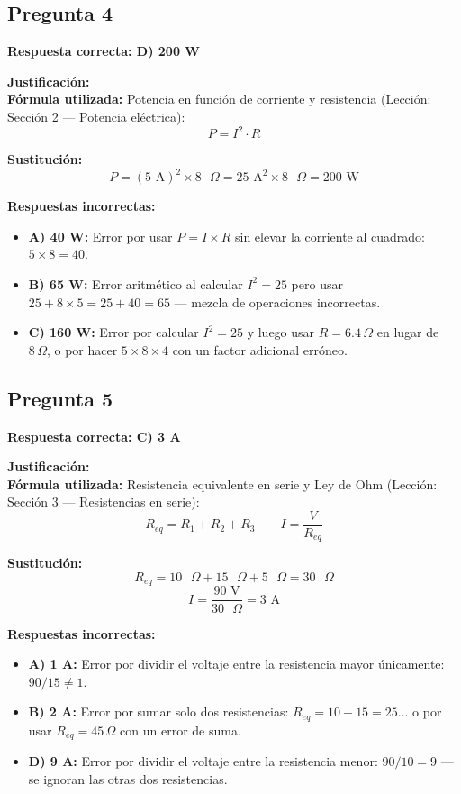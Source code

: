 \begin{respuestabox}
\subsection{Pregunta 4}
\textcolor{verdecorrecto}{\textbf{Respuesta correcta: D) 200 W}}

\textbf{Justificación:}\\
\textbf{Fórmula utilizada:} Potencia en función de corriente y resistencia (Lección: Sección 2 — Potencia eléctrica):
$$P = I^2 \cdot R$$

\textbf{Sustitución:}
$$P = (5 \text{ A})^2 \times 8 \text{ }\Omega = 25 \text{ A}^2 \times 8 \text{ }\Omega = 200 \text{ W}$$

\textbf{Respuestas incorrectas:}
\begin{itemize}
    \item \textbf{A) 40 W:} Error por usar $P = I \times R$ sin elevar la corriente al cuadrado: $5 \times 8 = 40$.
    \item \textbf{B) 65 W:} Error aritmético al calcular $I^2 = 25$ pero usar $25 + 8 \times 5 = 25 + 40 = 65$ — mezcla de operaciones incorrectas.
    \item \textbf{C) 160 W:} Error por calcular $I^2 = 25$ y luego usar $R = 6.4\,\Omega$ en lugar de $8\,\Omega$, o por hacer $5 \times 8 \times 4$ con un factor adicional erróneo.
\end{itemize}
\end{respuestabox}

\begin{respuestabox}
\subsection{Pregunta 5}
\textcolor{verdecorrecto}{\textbf{Respuesta correcta: C) 3 A}}

\textbf{Justificación:}\\
\textbf{Fórmula utilizada:} Resistencia equivalente en serie y Ley de Ohm (Lección: Sección 3 — Resistencias en serie):
$$R_{eq} = R_1 + R_2 + R_3 \qquad I = \frac{V}{R_{eq}}$$

\textbf{Sustitución:}
$$R_{eq} = 10 \text{ }\Omega + 15 \text{ }\Omega + 5 \text{ }\Omega = 30 \text{ }\Omega$$
$$I = \frac{90 \text{ V}}{30 \text{ }\Omega} = 3 \text{ A}$$

\textbf{Respuestas incorrectas:}
\begin{itemize}
    \item \textbf{A) 1 A:} Error por dividir el voltaje entre la resistencia mayor únicamente: $90/15 \neq 1$.
    \item \textbf{B) 2 A:} Error por sumar solo dos resistencias: $R_{eq} = 10 + 15 = 25$... o por usar $R_{eq} = 45\,\Omega$ con un error de suma.
    \item \textbf{D) 9 A:} Error por dividir el voltaje entre la resistencia menor: $90/10 = 9$ — se ignoran las otras dos resistencias.
\end{itemize}
\end{respuestabox}


